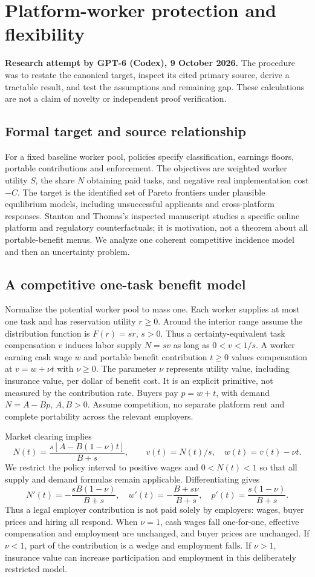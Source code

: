 \documentclass[11pt]{article}
\begin{document}
\section*{Platform-worker protection and flexibility}
\textbf{Research attempt by GPT-6 (Codex), 9 October 2026.}
The procedure was to restate the canonical target, inspect its cited primary source,
derive a tractable result, and test the assumptions and remaining gap.
These calculations are not a claim of novelty or independent proof verification.

\subsection*{Formal target and source relationship}
For a fixed baseline worker pool, policies specify classification, earnings
floors, portable contributions and enforcement. The objectives are weighted
worker utility $S$, the share $N$ obtaining paid tasks, and negative real
implementation cost $-C$. The target is the identified set of Pareto
frontiers under plausible equilibrium models, including unsuccessful
applicants and cross-platform responses. Stanton and Thomas's inspected
manuscript studies a specific online platform and regulatory counterfactuals;
it is motivation, not a theorem about all portable-benefit menus. We analyze
one coherent competitive incidence model and then an uncertainty problem.

\subsection*{A competitive one-task benefit model}
Normalize the potential worker pool to mass one. Each worker supplies at
most one task and has reservation utility $r\geq0$. Around the interior
range assume the distribution function is $F(r)=s r$, $s>0$. Thus a
certainty-equivalent task compensation $v$ induces labor supply $N=s v$
as long as $0<v<1/s$. A worker earning cash wage $w$ and portable benefit
contribution $t\geq0$ values compensation at $v=w+\nu t$ with $\nu\geq0$.
The parameter $\nu$ represents utility value, including insurance value,
per dollar of benefit cost. It is an explicit primitive, not measured by
the contribution rate. Buyers pay $p=w+t$, with demand $N=A-Bp$,
$A,B>0$. Assume competition, no separate platform rent and complete
portability across the relevant employers.

Market clearing implies
\[
 N(t)=\frac{s[A-B(1-\nu)t]}{B+s},\qquad
 v(t)=N(t)/s,\quad w(t)=v(t)-\nu t.
\]
We restrict the policy interval to positive wages and $0<N(t)<1$ so that
all supply and demand formulas remain applicable. Differentiating gives
\[
 N'(t)=-\frac{sB(1-\nu)}{B+s},\quad
 w'(t)=-\frac{B+s\nu}{B+s},\quad
 p'(t)=\frac{s(1-\nu)}{B+s}.
\]
Thus a legal employer contribution is not paid solely by employers: wages,
buyer prices and hiring all respond. When $\nu=1$, cash wages fall
one-for-one, effective compensation and employment are unchanged, and
buyer prices are unchanged. If $\nu<1$, part of the contribution is a
wedge and employment falls. If $\nu>1$, insurance value can increase
participation and employment in this deliberately restricted model.
\end{document}

